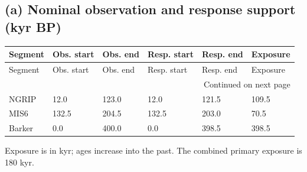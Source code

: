 \subsection*{(a) Nominal observation and response support (kyr BP)}
{\small
\begin{longtable}{llllll}
\toprule
Segment & Obs. start & Obs. end & Resp. start & Resp. end & Exposure \\
\midrule
\endfirsthead
\toprule
Segment & Obs. start & Obs. end & Resp. start & Resp. end & Exposure \\
\midrule
\endhead
\midrule
\multicolumn{6}{r}{Continued on next page} \\
\midrule
\endfoot
\bottomrule
\endlastfoot
NGRIP & 12.0 & 123.0 & 12.0 & 121.5 & 109.5 \\
MIS6 & 132.5 & 204.5 & 132.5 & 203.0 & 70.5 \\
Barker & 0.0 & 400.0 & 0.0 & 398.5 & 398.5 \\
\end{longtable}
}
Exposure is in kyr; ages increase into the past. The combined primary exposure is 180 kyr.
